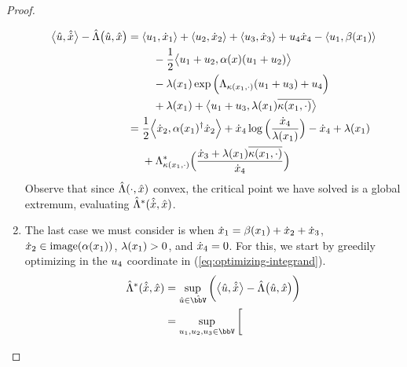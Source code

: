 \begin{proof}
\begin{enumerate}
      \begin{align*}
        {\big\langle \hat{u}, \hat{\dot{x}}\big\rangle} - \hat{\Lambda}\big(\hat{u}, \hat{x}\big) 
        &=\begin{aligned}[t]
          &{\langle u_1 , \dot{x}_1 \rangle} 
          + {\langle u_2 , \dot{x}_2 \rangle} 
          + {\langle u_3 , \dot{x}_3 \rangle} 
          + u_4\dot{x}_4
          - {\langle u_1 , \beta(x_1) \rangle}  \\
          &\quad- \frac12{\big\langle u_1+u_2 , \alpha(x)(u_1+u_2) \big\rangle} \\
          &\quad- \lambda(x_1)\exp\Big(\Lambda_{\kappa(x_1,\cdot)}(u_1+u_3) + u_4\Big) \\
          &\quad+ \lambda(x_1) 
          + {\big\langle u_1+u_3 , \lambda(x_1)\overline{\kappa(x_1,\cdot)} \big\rangle}
        \end{aligned} \\
        &= \begin{aligned}[t]
          &\frac12{\Big\langle \dot{x}_2 , \alpha(x_1)^\dagger\dot{x}_2 \Big\rangle} + \dot{x}_4 \log\Big(\frac{\dot{x}_4}{\lambda(x_1)}\Big) - \dot{x}_4 + \lambda(x_1) \\
          &+ \Lambda_{\kappa(x_1,\cdot)}^*\Big(\frac{\dot{x}_3+\lambda(x_1)\overline{\kappa(x_1,\cdot)}}{\dot{x}_4}\Big)
        \end{aligned}
      \end{align*}
      Observe that since $\hat{\Lambda}(\cdot,\hat{x})$ convex, the critical point we have solved is a global extremum, evaluating $\hat{\Lambda}^*(\hat{\dot{x}},\hat{x})$.
    \item
      The last case we must consider is when $\dot{x}_1 = \beta(x_1) + \dot{x}_2 + \dot{x}_3$, $\dot{x}_2 \in \operatorname{image}(\alpha(x_1))$, $\lambda(x_1) > 0$, and $\dot{x}_4 = 0$.
      For this, we start by greedily optimizing in the $u_4$ coordinate in (\ref{eq:optimizing-integrand}).
      \begin{align*}
        \hat\ode^*(\hat{\diffVar}, \hat\stateVar) 
        &= \sup_{\hat\momentVar \in \hat\vecSpace} \bigg( \bprj{\hat\momentVar}{\hat\diffVar} - \hat\ode\big(\hat\momentVar, \hat\stateVar\big) \bigg)  \\
        &= \sup_{\momentVar_1,\momentVar_2,\momentVar_3 \in \vecSpace} \bigg[ \begin{aligned}[t]

\end{aligned}
\end{align*}
\end{enumerate}
\end{proof}

